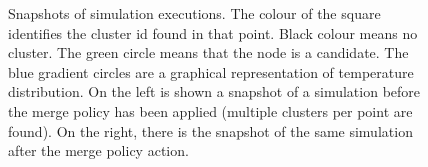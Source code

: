 \begin{figure}[t]
\begin{subfigure}[b]{0.45\textwidth}
  \end{subfigure}
  \centering
  \caption{Snapshots of simulation executions. 
  The colour of the square identifies the cluster id found in that point. 
  Black colour means no cluster. 
  The green circle means that the node is a candidate. 
  The blue gradient circles are a graphical representation of temperature distribution. 
  On the left is shown a snapshot of a simulation before the merge policy has been applied (multiple clusters per point are found). 
  On the right, there is the snapshot of the same simulation after the merge policy action.}
  \label{fig:simulation-snapshot}
\end{figure}